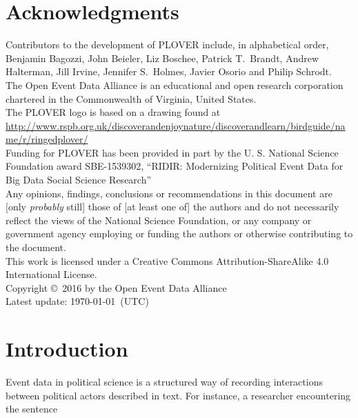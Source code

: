 \documentclass[11pt]{report}
\begin{document}

\chapter*{Acknowledgments}

\noindent Contributors to the development of PLOVER include, in alphabetical order, Benjamin Bagozzi, John Beieler, Liz Boschee, Patrick T.~Brandt, Andrew Halterman, Jill Irvine, Jennifer S.~Holmes, Javier Osorio and Philip Schrodt.\\

\noindent The Open Event Data Alliance is an educational and open research corporation chartered in the Commonwealth of Virginia, United States.\\

\noindent The PLOVER logo is based on a drawing found at\\ \url{http://www.rspb.org.uk/discoverandenjoynature/discoverandlearn/birdguide/name/r/ringedplover/}\\

\noindent Funding for PLOVER has been provided in part by the U. S. National Science Foundation award SBE-1539302, ``RIDIR: Modernizing Political Event Data for Big Data Social Science Research''\\

\noindent Any opinions, findings, conclusions or recommendations in this document are [only \textit{probably} still] those of [at least one of] the authors and do not necessarily reflect the views of the National Science Foundation, or any company or government agency employing or funding the authors or otherwise contributing to the document.\\

\noindent This work is licensed under a Creative Commons Attribution-ShareAlike 4.0 International License.\\

\noindent  Copyright \copyright ~2016 by the Open Event Data Alliance \\

\noindent Latest update: \today~(UTC)

\chapter{Introduction}

Event data in political science is a structured way of recording interactions
between political actors described in text. For instance, a researcher
encountering the sentence 
\end{document}
